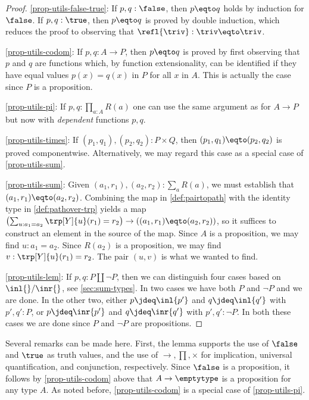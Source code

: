 \begin{proof}
\ref{prop-utils-false-true}:
If $p,q : \false$, then $p \eqto q$ holds by induction for $\false$.
If $p,q : \true$, then $p \eqto q$ is proved by double induction,
which reduces the proof to observing that $\refl{\triv}: \triv \eqto \triv$.

\ref{prop-utils-codom}:
If $p,q : A\to P$, then $p \eqto q$ is proved by first observing that $p$ and $q$
are functions which, by function extensionality, can be identified if they have
equal values $p(x) = q(x)$ in $P$ for all $x$ in $A$. This is
actually the case since $P$ is a proposition.

\ref{prop-utils-pi}:
If $p,q : \prod_{a:A} R(a)$ one can use the same argument as for $A\to P$
but now with \emph{dependent} functions $p,q$.

\ref{prop-utils-times}:
If $(p_1,q_1),(p_2,q_2) : P\times Q$, then $(p_1,q_1) \eqto (p_2,q_2)$
is proved componentwise.  Alternatively, we may regard this case as a special case of \ref{prop-utils-sum}.

\ref{prop-utils-sum}:
Given $(a_1,r_1), (a_2,r_2) : \sum_a R(a)$, we must establish that $(a_1,r_1) \eqto (a_2,r_2)$.  Combining the map in \cref{def:pairtopath} with the
identity type in \cref{def:pathover-trp} yields a map $ \left( \sum_{u : a_1 = a_2} \trp[Y]{u}(r_1) = r_2 \right) \to \left( (a_1,r_1) \eqto (a_2,r_2)
\right)$, so it suffices to construct an element in the source of the map.  Since $A$ is a proposition, we may find $u : a_1 = a_2$.  Since
$R(a_2)$ is a proposition, we may find $v : \trp[Y]{u}(r_1) = r_2$.  The pair $(u,v)$ is what we wanted to find.

\ref{prop-utils-lem}:
If $p,q : P\amalg \neg P$, then we can distinguish four cases
based on $\inl{}/\inr{}$, see \cref{sec:sum-types}. In two cases
we have both $P$ and $\neg P$ and we are done. In the other two,
either $p\jdeq \inl{p'}$ and $q\jdeq \inl{q'}$ with $p',q':P$,
or $p\jdeq \inr{p'}$ and $q\jdeq \inr{q'}$ with $p',q':\neg P$.
In both these cases we are done since $P$ and $\neg P$
are propositions.
\end{proof}

Several remarks can be made here. First, the lemma supports the
use of $\false$ and $\true$ as truth values, and the use of
$\to,\prod,\times$ for implication, universal quantification,
and conjunction, respectively. Since $\false$ is a proposition,
it follows by \ref{prop-utils-codom} above that
$A\to\emptytype$ is a proposition for any type $A$.
As noted before, \ref{prop-utils-codom} is a
special case of \ref{prop-utils-pi}.

